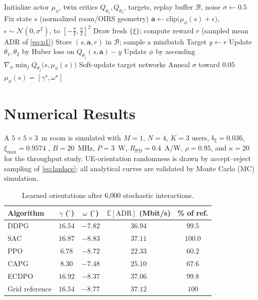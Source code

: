 \documentclass[conference]{IEEEtran}
\newcommand{\E}{\mathbb{E}}
\begin{document}
\begin{algorithm}[t]
\caption{ECDPO for OIRS orientation optimization}
\label{alg:ecdpo}
\begin{algorithmic}[1]
\State Initialize actor $\mu_\phi$, twin critics $Q_{\theta_1},Q_{\theta_2}$,
targets, replay buffer $\mathcal{B}$, noise $\sigma\!\leftarrow\!0.5$
\State Fix state $s$ (normalized room/OIRS geometry)
  \State $\mathbf a\!\leftarrow\!\mathrm{clip}\bigl(\mu_\phi(s)+\epsilon\bigr)$,
         $\epsilon\!\sim\!\mathcal{N}(0,\sigma^2)$, to $[-\tfrac{\pi}{2},\tfrac{\pi}{2}]^2$
  \State Draw fresh $\{\xi\}$; compute reward $r$ (sampled mean ADR of \eqref{eq:p1})
  \State Store $(s,\mathbf a,r)$ in $\mathcal{B}$; sample a minibatch
  \State Target $y\!\leftarrow\!r$ 
  \State Update $\theta_1,\theta_2$ by Huber loss on $Q_{\theta_j}(s,\mathbf a)-y$
    \State Update $\phi$ by ascending
           $\nabla_\phi \min_{j}Q_{\theta_j}\bigl(s,\mu_\phi(s)\bigr)$
    \State Soft-update target networks
  \EndIf
  \State Anneal $\sigma$ toward $0.05$
\EndFor
\State \Return $\mu_\phi(s)=[\gamma^\star,\omega^\star]$
\end{algorithmic}
\end{algorithm}

\section{Numerical Results}
A $5\times5\times3$~m room is simulated with $M=1$, $N=4$, $K=3$
users, $b_\xi=0.036$, $\xi_{\max}=0.9574$ \cite{soltani2018},
$B=20$~MHz, $P=3$~W, $R_{\mathrm{PD}}=0.4$~A/W, $\rho=0.95$, and
$\kappa=20$ for the throughput study. UE-orientation randomness is drawn by
accept--reject sampling of \eqref{eq:laplace}; all analytical curves are
validated by Monte Carlo (MC) simulation.

\begin{table}[t]
\centering
\caption{Learned orientations after 6{,}000 stochastic interactions.}
\label{tab:results}
\begin{tabular}{lcccc}
\toprule
Algorithm & $\gamma$ ($^\circ$) & $\omega$ ($^\circ$) &
$\E[\mathrm{ADR}]$ (Mbit/s) & \% of ref. \\
\midrule
DDPG & $16.54$ & $-7.82$ & $36.94$ & $99.5$ \\
SAC & $16.87$ & $-8.83$ & $37.11$ & $100.0$ \\
PPO & $6.78$ & $-8.72$ & $22.33$ & $60.2$ \\
CAPG & $8.30$ & $-7.48$ & $25.10$ & $67.6$ \\
ECDPO & $16.92$ & $-8.37$ & $37.06$ & $99.8$ \\
\midrule
Grid reference & $16.54$ & $-8.77$ & $37.12$ & $100$ \\
\bottomrule
\end{tabular}
\end{table}
\end{document}
